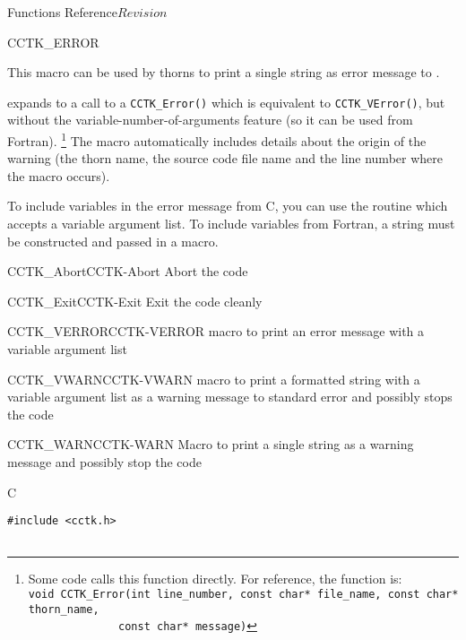 \begin{cactuspart}{ Functions Reference}{}{$Revision$}
\begin{FunctionDescription}{CCTK\_ERROR}
\begin{Discussion}
This macro can be used by thorns to print a single string as error
message to .

 expands to a call to a \verb|CCTK_Error()|
which is equivalent to \verb|CCTK_VError()|, but without the
variable-number-of-arguments feature (so it can be used from
Fortran).%
\footnote{%
         Some code calls this function directly.
         For reference, the function is:\\
         \texttt{\mbox{}void CCTK\_Error(int line\_number, const char* file\_name, const char* thorn\_name,}\\
         \texttt{\mbox{}~~~~~~~~~~~~~~const char* message)}
         }%
{}  The macro automatically includes details about the origin of the warning
(the thorn name, the source code file name and the line number where the macro
occurs).

To include variables in the error message from C, you can use the routine
 which accepts a variable argument list.
To include variables from Fortran, a string must be constructed and passed
in a  macro.
\end{Discussion}

\begin{SeeAlsoSection}
\begin{SeeAlso2}{CCTK\_Abort}{CCTK-Abort}
Abort the code
\end{SeeAlso2}
\begin{SeeAlso2}{CCTK\_Exit}{CCTK-Exit}
Exit the code cleanly
\end{SeeAlso2}
\begin{SeeAlso2}{CCTK\_VERROR}{CCTK-VERROR}
macro to print an error message with a variable argument list
\end{SeeAlso2}
\begin{SeeAlso2}{CCTK\_VWARN}{CCTK-VWARN}
macro to print a formatted string with a variable argument list as a warning
message to standard error and possibly stops the code
\end{SeeAlso2}
\begin{SeeAlso2}{CCTK\_WARN}{CCTK-WARN}
Macro to print a single string as a warning message and possibly stop the code
\end{SeeAlso2}
\end{SeeAlsoSection}

\begin{ExampleSection}
\begin{Example}{C}
\begin{verbatim}
#include <cctk.h>


\end{verbatim}
\end{Example}
\end{ExampleSection}
\end{FunctionDescription}
\end{cactuspart}
